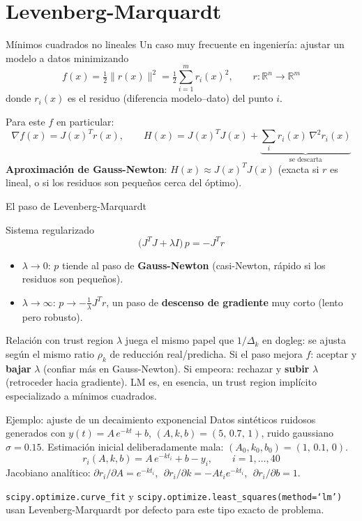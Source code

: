 \documentclass[aspectratio=169]{beamer}
\newcommand{\grad}{\nabla}
\begin{document}
\section{Levenberg-Marquardt}

\begin{frame}{M\'inimos cuadrados no lineales}
  Un caso muy frecuente en ingenier\'ia: ajustar un modelo a datos minimizando
  \[ f(x) = \tfrac12\|r(x)\|^2 = \tfrac12\sum_{i=1}^m r_i(x)^2, \qquad r:\mathbb{R}^n\to\mathbb{R}^m \]
  donde $r_i(x)$ es el residuo (diferencia modelo--dato) del punto $i$.

  Para este $f$ en particular:
  \[ \grad f(x) = J(x)^T r(x), \qquad H(x) = J(x)^T J(x) + \underbrace{\sum_i r_i(x)\, \grad^2 r_i(x)}_{\text{se descarta}} \]
  \textbf{Aproximaci\'on de Gauss-Newton}: $H(x) \approx J(x)^T J(x)$ (exacta si $r$ es lineal, o si los residuos son peque\~nos cerca del \'optimo).
\end{frame}

\begin{frame}{El paso de Levenberg-Marquardt}
  \begin{block}{Sistema regularizado}
    \[ \big(J^T J + \lambda I\big)\, p = -J^T r \]
  \end{block}
  \begin{itemize}
    \item $\lambda \to 0$: $p$ tiende al paso de \textbf{Gauss-Newton} (casi-Newton, r\'apido si los residuos son peque\~nos).
    \item $\lambda \to \infty$: $p \to -\tfrac1\lambda J^T r$, un paso de \textbf{descenso de gradiente} muy corto (lento pero robusto).
  \end{itemize}
  \begin{alertblock}{Relaci\'on con trust region}
    $\lambda$ juega el mismo papel que $1/\Delta_k$ en dogleg: se ajusta seg\'un el mismo ratio $\rho_k$ de reducci\'on real/predicha. Si el paso mejora $f$: aceptar y \textbf{bajar} $\lambda$ (confiar m\'as en Gauss-Newton). Si empeora: rechazar y \textbf{subir} $\lambda$ (retroceder hacia gradiente). LM es, en esencia, un trust region impl\'icito especializado a m\'inimos cuadrados.
  \end{alertblock}
\end{frame}

\begin{frame}{Ejemplo: ajuste de un decaimiento exponencial}
  Datos sint\'eticos ruidosos generados con $y(t) = A\,e^{-kt} + b$, $(A,k,b)=(5,\,0.7,\,1)$, ruido gaussiano $\sigma=0.15$. Estimaci\'on inicial deliberadamente mala: $(A_0,k_0,b_0)=(1,\,0.1,\,0)$.
  \[
  r_i(A,k,b) = A\,e^{-k t_i} + b - y_i, \qquad i=1,\dots,40
  \]
  Jacobiano anal\'itico: $\partial r_i/\partial A = e^{-kt_i}$, $\;\partial r_i/\partial k = -A t_i e^{-kt_i}$, $\;\partial r_i/\partial b = 1$.

  \texttt{scipy.optimize.curve\_fit} y \texttt{scipy.optimize.least\_squares(method=`lm')} usan Levenberg-Marquardt por defecto para este tipo exacto de problema.
\end{frame}
\end{document}
